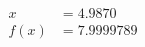\documentclass[preview]{standalone}
\begin{document}
\begin{align*}
x &= 4.9870\\f(x) &= 7.9999789
\end{align*}
\end{document}

